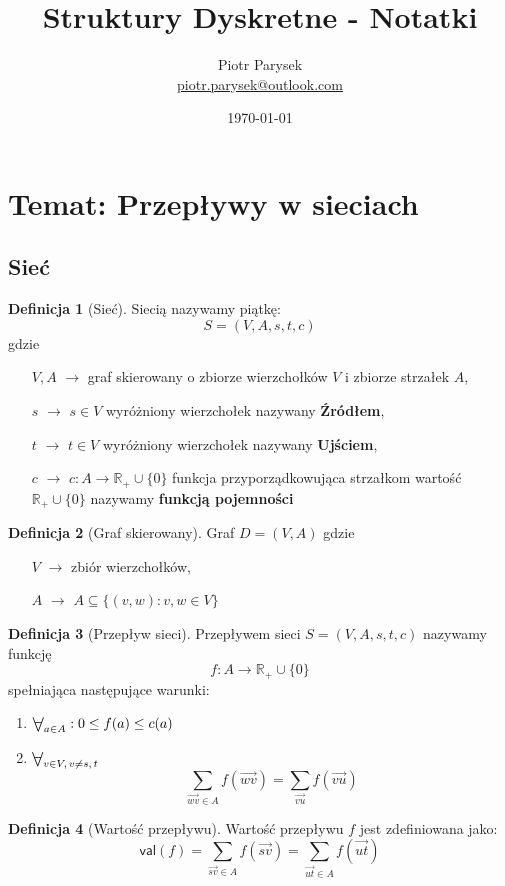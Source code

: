 \documentclass[a4paper,12pt]{article}
\title{Struktury Dyskretne - Notatki}
\author{Piotr Parysek\\
\href{mailto:piotr.parysek@outlook.com}{piotr.parysek@outlook.com} }
\date{\today}
\theoremstyle{definition}%
\theoremstyle{definition}
\newtheorem{definition}{Definicja}%
\theoremstyle{problem}
\let\originalforall=\forall%
\renewcommand{\forall}{\mathop{\vcenter{\hbox{\Large$\originalforall$}}}}
\begin{document}
\maketitle

\tableofcontents
\section[Wykład 6: 30-III-2017 - Temat: Przepływy w sieciach]{Temat: Przepływy w sieciach}
\subsection{Sieć}
\begin{definition}[Sieć]
Siecią nazywamy piątkę: $$S=(V,A,s,t,c)$$ gdzie
\begin{itemize}
\item[$V,A$] $\rightarrow $ graf skierowany o zbiorze wierzchołków $V$ i zbiorze strzałek $A$,
\item[$s$] $\rightarrow $ $s\in V$ wyróżniony wierzchołek nazywany \textbf{Źródłem},
\item[$t$] $\rightarrow $ $t\in V$ wyróżniony wierzchołek nazywany \textbf{Ujściem},
\item[$c$] $\rightarrow $ $c:A\rightarrow \mathbb{R} _+\cup \{0\}$ funkcja przyporządkowująca strzałkom wartość $\mathbb{R} _+\cup \{0\}$ nazywamy \textbf{funkcją pojemności}
\end{itemize}
\end{definition}
\begin{definition}[Graf skierowany]
Graf $D=(V,A)$ gdzie 
\begin{itemize}
\item[$V$] $\rightarrow $ zbiór wierzchołków,
\item[$A$] $\rightarrow $ $A\subseteq \{(v,w):v,w\in V\}$
\end{itemize}
\end{definition}
\begin{definition}[Przepływ sieci]
Przepływem sieci $S=(V,A,s,t,c)$ nazywamy funkcję $$f:A\rightarrow \mathbb{R}_+\cup \{0\}$$ spełniająca następujące warunki:
\begin{enumerate}[label=\alph*)]
\item $\forall _{a\in A}: 0\leq f(a)\leq c(a)$
\item $\forall _{v\in V,\, v\neq s,\, t}$
$$\sum _{\vec{wv}\in A}f(\vec{wv})=\sum _{\vec{vu}}f(\vec{vu})$$
\end{enumerate}
\end{definition}
\begin{definition}[Wartość przepływu]
Wartość przepływu $f$ jest zdefiniowana jako:
$$\mathsf{val}(f)=\sum _{\vec{sv}\in A}f(\vec{sv})=\sum _{\vec{ut}\in A} f(\vec{ut})$$
\end{definition}
\end{document}
